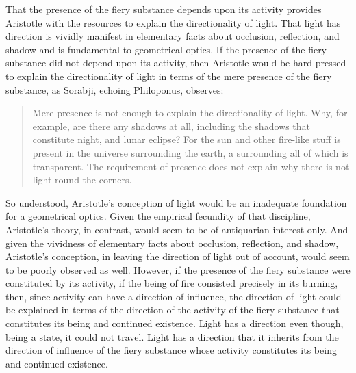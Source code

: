 That the presence of the fiery substance depends upon its activity provides Aristotle with the resources to explain the directionality of light. That light has direction is vividly manifest in elementary facts about occlusion, reflection, and shadow and is fundamental to geometrical optics. If the presence of the fiery substance did not depend upon its activity, then Aristotle would be hard pressed to explain the directionality of light in terms of the mere presence of the fiery substance, as Sorabji, echoing Philoponus, observes: 
\begin{quote}
	Mere presence is not enough to explain the directionality of light. Why, for example, are there any shadows at all, including the shadows that constitute night, and lunar eclipse? For the sun and other fire-like stuff is present in the universe surrounding the earth, a surrounding all of which is transparent. The requirement of presence does not explain why there is not light round the corners. \citep[132]{Sorabji:2004fk}
\end{quote}
So understood, Aristotle's conception of light would be an inadequate foundation for a geometrical optics. Given the empirical fecundity of that discipline, Aristotle's theory, in contrast, would seem to be of antiquarian interest only. And given the vividness of elementary facts about occlusion, reflection, and shadow, Aristotle's conception, in leaving the direction of light out of account, would seem to be poorly observed as well. However, if the presence of the fiery substance were constituted by its activity, if the being of fire consisted precisely in its burning, then, since activity can have a direction of influence, the direction of light could be explained in terms of the direction of the activity of the fiery substance that constitutes its being and continued existence. Light has a direction even though, being a state, it could not travel. Light has a direction that it inherits from the direction of influence of the fiery substance whose activity constitutes its being and continued existence.

